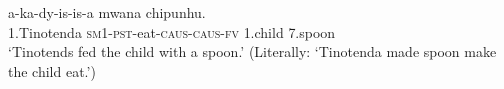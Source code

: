 \documentclass[output=paper,modfonts,nonflat,colorlinks,citecolor=brown]{langsci/langscibook}
\begin{document}
\ex\label{ex:wechsler:10b}
 {a-ka-dy-is-is-a}  {{mwana}}  {{chipunhu}}.\\
 1.Tinotenda  \textsc{sm}1-\textsc{pst}{}-eat-\textsc{caus}{}-\textsc{caus}{}-\textsc{fv}  {1.child}  {7.spoon}\\
\glt `Tinotends fed the child with a spoon.’
(Literally: ‘Tinotenda made spoon make the child eat.’)\\

\z
\z
\end{document}
